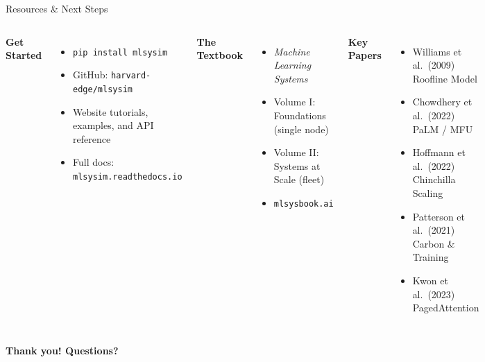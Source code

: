 \documentclass[aspectratio=169, 12pt]{beamer}
\begin{document}
\begin{frame}{Resources \& Next Steps}
\begin{columns}[T]
\textbf{Get Started}
\begin{itemize}
  \item \texttt{pip install mlsysim}
  \item GitHub: \texttt{harvard-edge/mlsysim}
  \item Website tutorials, examples, and API reference
  \item Full docs: \texttt{mlsysim.readthedocs.io}
\end{itemize}

\vspace{0.5em}
\textbf{The Textbook}
\begin{itemize}
  \item \emph{Machine Learning Systems}
  \item Volume I: Foundations (single node)
  \item Volume II: Systems at Scale (fleet)
  \item \texttt{mlsysbook.ai}
\end{itemize}

\textbf{Key Papers}
\begin{itemize}
  \item Williams et al.\ (2009)\\
        {\footnotesize Roofline Model}
  \item Chowdhery et al.\ (2022)\\
        {\footnotesize PaLM / MFU}
  \item Hoffmann et al.\ (2022)\\
        {\footnotesize Chinchilla Scaling}
  \item Patterson et al.\ (2021)\\
        {\footnotesize Carbon \& Training}
  \item Kwon et al.\ (2023)\\
        {\footnotesize PagedAttention}
\end{itemize}
\end{columns}

\vspace{1em}
\begin{center}
\Large\bfseries Thank you! Questions?
\end{center}
\end{frame}
\end{document}
